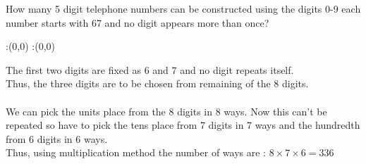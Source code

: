 



\question[4] How many 5 digit telephone numbers can be constructed using the digits 0-9 each number starts with 67 and no digit appears more than once?


\watchout

\ifprintanswers
  \begin{marginfigure}
      :(0,0)
      :(0,0)
    \figdrawbegin{}
      \figdrawline [100,101]
    \figdrawend
    \figvisu{\figBoxA}{}{%
    }
    \centerline{\box\figBoxA}
  \end{marginfigure}
\fi 

\begin{solution}[\halfpage]
The first two digits are fixed as 6 and 7 and no digit repeats itself. \\ 
Thus, the three digits are to be chosen from remaining of the 8 digits.\\ \\
We can pick the units place from the 8 digits in 8 ways. Now this can't be repeated so have to pick the tens place from 7 digits in 7 ways and the hundredth from 6 digits in 6 ways.\\
Thus, using multiplication method the number of ways are : $8\times 7 \times 6 = 336$      
\end{solution}


